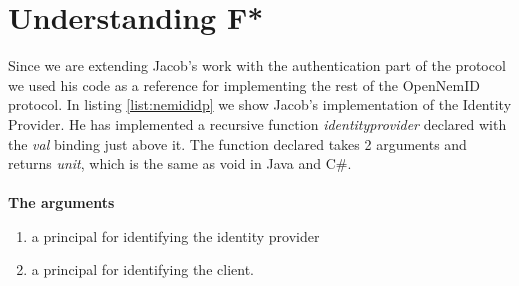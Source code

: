 \documentclass[twosided]{report}
\begin{document}
\section{Understanding F*}
Since we are extending Jacob's work with the authentication part of the protocol we used his code as a reference for implementing the rest of the OpenNemID protocol. In listing \ref{list:nemididp} we show Jacob's implementation of the Identity Provider. He has implemented a recursive function \emph{identityprovider} declared with the \emph{val} binding just above it. The function declared takes 2 arguments and returns \emph{unit}, which is the same as void in Java and C\#.
\\
\\
\textbf{The arguments}
\begin{enumerate}
\item a principal for identifying the identity provider
\item a principal for identifying the client.
\end{enumerate}
\end{document}
